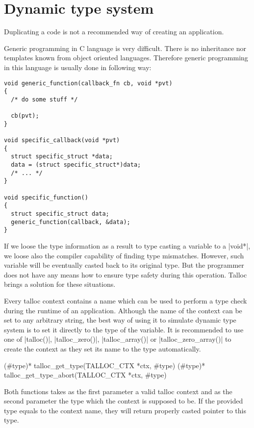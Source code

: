 \section{Dynamic type system}
\label{talloc:dyn-ts}

Duplicating a code is not a recommended way of creating an application. 

Generic programming in C language is very difficult. There is no inheritance nor
templates known from object oriented languages. Therefore generic programming in
this language is usually done in following way:

\begin{lstlisting}
void generic_function(callback_fn cb, void *pvt)
{
  /* do some stuff */
  
  cb(pvt);
}

void specific_callback(void *pvt)
{
  struct specific_struct *data;
  data = (struct specific_struct*)data;
  /* ... */
}

void specific_function()
{
  struct specific_struct data;
  generic_function(callback, &data);
}
\end{lstlisting}

If we loose the type information as a result to type casting a variable to a
|void*|, we loose also the compiler capability of finding type mismatches.
However, such variable will be eventually casted back to its original type. But
the programmer does not have any means how to ensure type safety during this
operation. Talloc brings a solution for these situations.

Every talloc context contains a name which can be used to perform a type check
during the runtime of an application. Although the name of the context can be
set to any arbitrary string, the best way of using it to simulate dynamic type
system is to set it directly to the type of the variable. It is recommended to
use one of |talloc()|, |talloc_zero()|, |talloc_array()| or
|talloc_zero_array()| to create the context as they set its name to the type
automatically.

\begin{funcproto}
(#type)* talloc_get_type(TALLOC_CTX *ctx, #type)
(#type)* talloc_get_type_abort(TALLOC_CTX *ctx, #type)
\end{funcproto}
\funclistend
Both functions takes as the first parameter a valid talloc context and as the
second parameter the type which the context is supposed to be. If the provided
type equals to the context name, they will return properly casted pointer to
this type.


